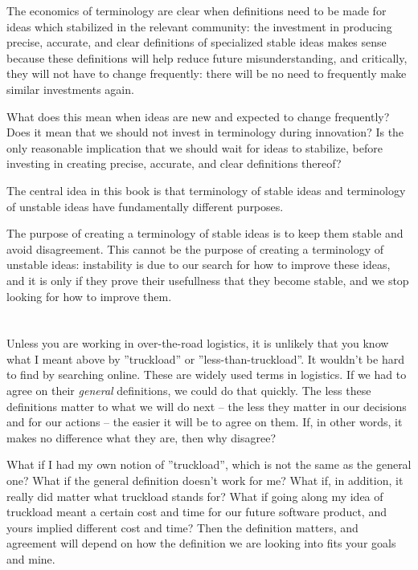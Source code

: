 \documentclass[graybox,envcountchap,sectrefs]{svmono}
\begin{document}
The economics of terminology are clear when definitions need to be made for ideas which stabilized in the relevant community: the investment in producing precise, accurate, and clear definitions of specialized stable ideas makes sense because these definitions will help reduce future misunderstanding, and critically, they will not have to change frequently: there will be no need to frequently make similar investments again.

What does this mean when ideas are new and expected to change frequently? Does it mean that we should not invest in terminology during innovation? Is the only reasonable implication that we should wait for ideas to stabilize, before investing in creating precise, accurate, and clear definitions thereof? 

The central idea in this book is that terminology of stable ideas and terminology of unstable ideas have fundamentally different purposes. 

The purpose of creating a terminology of stable ideas is to keep them stable and avoid disagreement. This cannot be the purpose of creating a terminology of unstable ideas: instability is due to our search for how to improve these ideas, and it is only if they prove their usefullness that they become stable, and we stop looking for how to improve them.







\section{}
Unless you are working in over-the-road logistics, it is unlikely that you know what I meant above by ''truckload'' or ''less-than-truckload''. It wouldn't be hard to find by searching online. These are widely used terms in logistics. If we had to agree on their \textit{general} definitions, we could do that quickly. The less these definitions matter to what we will do next -- the less they matter in our decisions and for our actions -- the easier it will be to agree on them. If, in other words, it makes no difference what they are, then why disagree?

What if I had my own notion of ''truckload'', which is not the same as the general one? What if the general definition doesn't work for me? What if, in addition, it really did matter what truckload stands for? What if going along my idea of truckload meant a certain cost and time for our future software product, and yours implied different cost and time? Then the definition matters, and agreement will depend on how the definition we are looking into fits your goals and mine.
\end{document}
